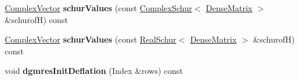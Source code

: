 \begin{DoxyCompactItemize}
\hyperlink{group___core___module_class_eigen_1_1_matrix}{Complex\+Vector} {\bfseries schur\+Values} (const \hyperlink{group___eigenvalues___module_class_eigen_1_1_complex_schur}{Complex\+Schur}$<$ \hyperlink{group___core___module}{Dense\+Matrix} $>$ \&schurofH) const
\item 
\mbox{\label{class_eigen_1_1_d_g_m_r_e_s_ab190f6dfa8e50b5e2e1a80c0cc7a31f2}} 
\hyperlink{group___core___module_class_eigen_1_1_matrix}{Complex\+Vector} {\bfseries schur\+Values} (const \hyperlink{group___eigenvalues___module_class_eigen_1_1_real_schur}{Real\+Schur}$<$ \hyperlink{group___core___module}{Dense\+Matrix} $>$ \&schurofH) const
\item 
\mbox{\label{class_eigen_1_1_d_g_m_r_e_s_a505c49553b8df373734e1a02e1c5ca70}} 
void {\bfseries dgmres\+Init\+Deflation} (Index \&rows) const
\end{DoxyCompactItemize}
